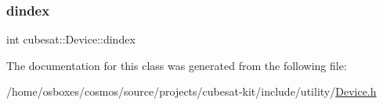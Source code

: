 \mbox{\label{classcubesat_1_1Device_a8a2b3d6d7400e6796c31705058172982}} 
\subsubsection{\texorpdfstring{dindex}{dindex}}
{\footnotesize\ttfamily int cubesat\+::\+Device\+::dindex\hspace{0.3cm}{\ttfamily [protected]}}



The documentation for this class was generated from the following file\+:\begin{DoxyCompactItemize}
\item 
/home/osboxes/cosmos/source/projects/cubesat-\/kit/include/utility/\hyperlink{Device_8h}{Device.\+h}\end{DoxyCompactItemize}
